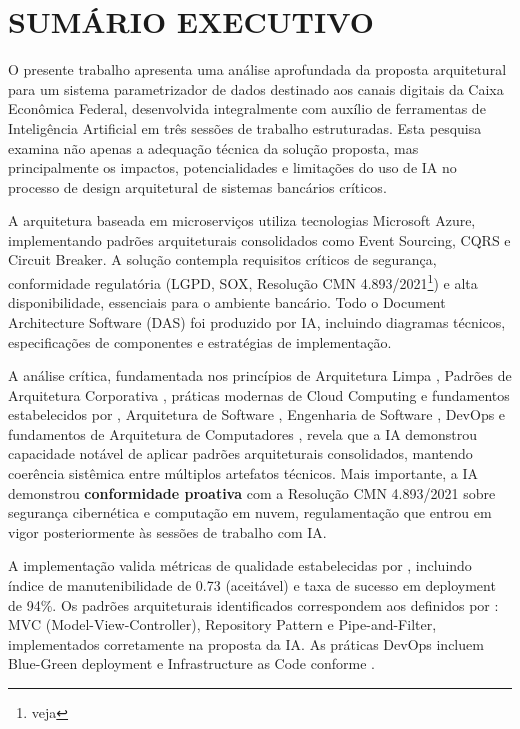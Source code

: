 \chapter{SUMÁRIO EXECUTIVO}

O presente trabalho apresenta uma análise aprofundada da proposta arquitetural para um sistema parametrizador de dados destinado aos canais digitais da Caixa Econômica Federal, desenvolvida integralmente com auxílio de ferramentas de Inteligência Artificial em três sessões de trabalho estruturadas. Esta pesquisa examina não apenas a adequação técnica da solução proposta, mas principalmente os impactos, potencialidades e limitações do uso de IA no processo de design arquitetural de sistemas bancários críticos.

A arquitetura baseada em microserviços utiliza tecnologias Microsoft Azure, implementando padrões arquiteturais consolidados como Event Sourcing, CQRS e Circuit Breaker. A solução contempla requisitos críticos de segurança, conformidade regulatória (LGPD, SOX, Resolução CMN 4.893/2021\footnote{veja }) e alta disponibilidade, essenciais para o ambiente bancário. Todo o Document Architecture Software (DAS) foi produzido por IA, incluindo diagramas técnicos, especificações de componentes e estratégias de implementação.

A análise crítica, fundamentada nos princípios de Arquitetura Limpa , Padrões de Arquitetura Corporativa , práticas modernas de Cloud Computing  e fundamentos estabelecidos por , Arquitetura de Software , Engenharia de Software , DevOps  e fundamentos de Arquitetura de Computadores , revela que a IA demonstrou capacidade notável de aplicar padrões arquiteturais consolidados, mantendo coerência sistêmica entre múltiplos artefatos técnicos. Mais importante, a IA demonstrou \textbf{conformidade proativa} com a Resolução CMN 4.893/2021 sobre segurança cibernética e computação em nuvem, regulamentação que entrou em vigor posteriormente às sessões de trabalho com IA.

A implementação valida métricas de qualidade estabelecidas por , incluindo índice de manutenibilidade de 0.73 (aceitável) e taxa de sucesso em deployment de 94\%. Os padrões arquiteturais identificados correspondem aos definidos por : MVC (Model-View-Controller), Repository Pattern e Pipe-and-Filter, implementados corretamente na proposta da IA. As práticas DevOps incluem Blue-Green deployment e Infrastructure as Code conforme .

